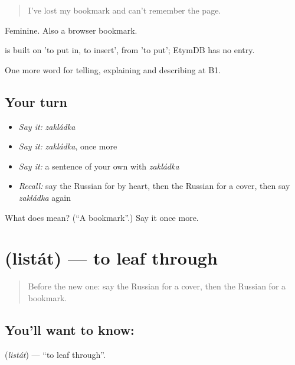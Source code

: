 \begin{quote}
I've lost my bookmark and can't remember the page.
\end{quote}

Feminine. Also a browser bookmark.

\begin{cousinweb}
\emph{} is built on \emph{} 'to put in, to insert', from \emph{} 'to put'; EtymDB has no entry.
\end{cousinweb}

\begin{grammarlens}[title={What you've built}]
One more word for telling, explaining and describing at B1.
\end{grammarlens}

\subsection*{Your turn}
\begin{itemize}
\raggedright
  \item \emph{Say it:} \emph{zakládka}
  \item \emph{Say it:} \emph{zakládka}, once more
  \item \emph{Say it:} a sentence of your own with \emph{zakládka}
  \item \emph{Recall:} say the Russian for by heart, then the Russian for a cover, then say \emph{zakládka} again
\end{itemize}

\begin{tcolorbox}[breakable,colback=teal!4,colframe=teal!35!black,title={Before you move on}]
What does  mean? (\textquotedblleft{}A bookmark\textquotedblright{}.) Say it once more.
\end{tcolorbox}
\section[\texorpdfstring{\ru{листать} (listát)}{листать (listát)}]{ (listát) — to leaf through}

\label{lesson:RU-C526-listat}



\begin{quote}
Before the new one: say the Russian for a cover, then the Russian for a bookmark.
\end{quote}

\subsection*{You'll want to know: }
\textbf{} (\emph{listát}) — \textquotedblleft{}to leaf through\textquotedblright{}.

